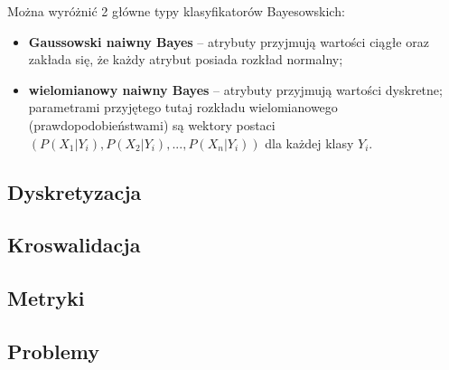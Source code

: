         \noindent Można wyróżnić 2 główne typy klasyfikatorów Bayesowskich:
        \begin{itemize}
            \item{\textbf{Gaussowski naiwny Bayes} -- atrybuty przyjmują wartości ciągłe oraz zakłada się, że każdy atrybut
                  posiada rozkład normalny;}
            \item{\textbf{wielomianowy naiwny Bayes} -- atrybuty przyjmują wartości dyskretne; parametrami przyjętego tutaj
                  rozkładu wielomianowego (prawdopodobieństwami) są wektory postaci $(P(X_1|Y_i), P(X_2|Y_i), ..., P(X_n|Y_i))$
                  dla każdej klasy $Y_i$.}
        \end{itemize}

    \subsection{Dyskretyzacja}
    \subsection{Kroswalidacja}
    \subsection{Metryki}
    \subsection{Problemy}